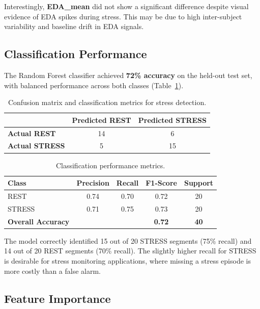 \documentclass[12pt,letterpaper]{article}
\begin{document}
Interestingly, \textbf{EDA\_mean} did not show a significant difference despite visual evidence of EDA spikes during stress. This may be due to high inter-subject variability and baseline drift in EDA signals.

\subsection{Classification Performance}

The Random Forest classifier achieved \textbf{72\% accuracy} on the held-out test set, with balanced performance across both classes (Table~\ref{tab:confusion}).

\begin{table}[H]
\centering
\caption{Confusion matrix and classification metrics for stress detection.}
\label{tab:confusion}
\begin{tabular}{lcc}
\toprule
& \textbf{Predicted REST} & \textbf{Predicted STRESS} \\
\midrule
\textbf{Actual REST}   & 14 & 6  \\
\textbf{Actual STRESS} & 5  & 15 \\
\bottomrule
\end{tabular}
\end{table}

\begin{table}[H]
\centering
\caption{Classification performance metrics.}
\label{tab:metrics}
\begin{tabular}{lcccc}
\toprule
\textbf{Class} & \textbf{Precision} & \textbf{Recall} & \textbf{F1-Score} & \textbf{Support} \\
\midrule
REST    & 0.74 & 0.70 & 0.72 & 20 \\
STRESS  & 0.71 & 0.75 & 0.73 & 20 \\
\midrule
\textbf{Overall Accuracy} & & & \textbf{0.72} & \textbf{40} \\
\bottomrule
\end{tabular}
\end{table}

The model correctly identified 15 out of 20 STRESS segments (75\% recall) and 14 out of 20 REST segments (70\% recall). The slightly higher recall for STRESS is desirable for stress monitoring applications, where missing a stress episode is more costly than a false alarm.

\subsection{Feature Importance}
\end{document}
